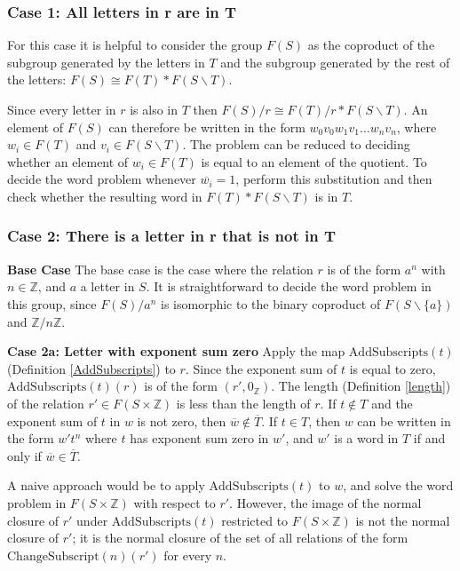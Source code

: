 \documentclass[11pt]{article} %
\theoremstyle{definition}
\theoremstyle{definition}
\theoremstyle{definition}
\theoremstyle{definition}
\theoremstyle{definition}
\theoremstyle{definition}
\begin{document}
\subsubsection{Case 1: All letters in r are in T}\label{allinT}
For this case it is helpful to consider the group $F(S)$ as the
coproduct of the subgroup generated by the letters in $T$ and
the subgroup generated by the rest of the letters:
$F(S) \cong F(T) \ast F(S \backslash T)$.

Since every letter in $r$ is also in $T$ then $F(S) / r \cong F(T) / r \ast F(S \backslash T)$.
An element of $F(S)$ can therefore be written in the form
$w_0v_0w_1v_1 \dots w_nv_n$, where $w_i \in F(T)$ and $v_i \in F(S \backslash T)$.
The problem can be reduced to deciding whether an element of $w_i \in F(T)$ is equal to an element of the quotient.
To decide the word problem whenever $\overline{w_i} = 1$, perform this substitution and
then check whether the resulting word in $F(T) \ast F(S \backslash T)$ is in $T$.

\subsubsection{Case 2: There is a letter in r that is not in T}\label{xandt}
\textbf{Base Case}
The base case is the case where the relation $r$ is of the form $a^n$ with
$n \in \mathbb{Z}$, and $a$ a letter in $S$. It is straightforward to decide
the word problem in this group, since $F(S) / a^n$ is isomorphic
to the binary coproduct of $F(S \backslash \{a\})$ and $\mathbb{Z}/n\mathbb{Z}$.

\textbf{Case 2a: Letter with exponent sum zero}\label{expsumzero}
Apply the map $\text{AddSubscripts}(t)$ (Definition \ref{AddSubscripts}) to $r$.
Since the exponent sum of $t$ is equal to zero, $\text{AddSubscripts}(t)(r)$ is
of the form $(r', 0_\mathbb{Z})$.
The length (Definition \ref{length}) of the relation $r' \in F(S \times \mathbb{Z})$
is less than the length of $r$.
If $t \notin T$ and the exponent sum of $t$ in $w$ is not zero,
then $\overline{w} \notin \overline{T}$.
If $t \in T$, then $w$ can be written in the
form $w' t^n$ where $t$ has exponent sum zero in $w'$, and $w'$ is a word in $T$ if
and only if $\overline{w} \in \overline{T}$.

A naive approach would be to apply $\text{AddSubscripts}(t)$ to $w$, and solve the word
problem in $F(S \times \mathbb{Z})$ with respect to $r'$. However, the image of the normal closure of $r'$ under $\text{AddSubscripts}(t)$ restricted
to $F(S \times \mathbb{Z})$ is not the normal closure of $r'$; it is the normal closure of
the set of all relations of the form $\text{ChangeSubscript}(n)(r')$ for every $n$.
\end{document}
